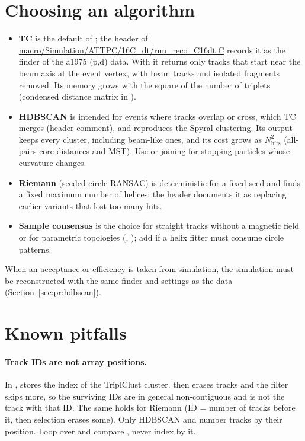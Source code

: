 \section{Choosing an algorithm}

\begin{itemize}
\item \textbf{TC} is the default of ; the header of
  \url{macro/Simulation/ATTPC/16C_dt/run_reco_C16dt.C} records it as the finder of the a1975 (p,d) data. With  it returns only tracks that start near the beam axis
  at the event vertex, with beam tracks and isolated fragments removed. Its memory grows with the square
  of the number of triplets (condensed distance matrix in ).
\item \textbf{HDBSCAN} is intended for events where tracks overlap or cross, which TC merges (header
  comment), and reproduces the Spyral clustering. Its output keeps every cluster, including beam-like
  ones, and its cost grows as $N_\mathrm{hits}^2$ (all-pairs core distances and MST). Use
   or  joining for stopping particles whose curvature changes.
\item \textbf{Riemann} (seeded circle RANSAC) is deterministic for a fixed seed and finds a fixed maximum
  number of helices; the header documents it as replacing earlier variants that lost too many hits.
\item \textbf{Sample consensus} is the choice for straight tracks without a magnetic field or for
  parametric topologies (, ); add  if a helix fitter
  must consume circle patterns.
\end{itemize}
When an acceptance or efficiency is taken from simulation, the simulation must be reconstructed with the
same finder and settings as the data (Section~\ref{sec:pr:hdbscan}).

\section{Known pitfalls}
\label{sec:pr:pitfalls}

\paragraph{Track IDs are not array positions.} In , 
stores the index of the TriplClust cluster.  then erases tracks and the
 filter skips more, so the surviving IDs are in general non-contiguous and
 is not the track with that ID. The same holds for Riemann (ID = number of tracks
before it, then selection erases some). Only HDBSCAN and  number tracks by their
position. Loop over  and compare , never index by it.

